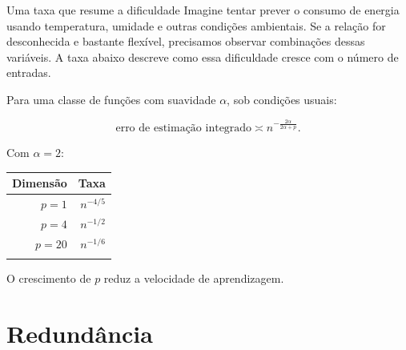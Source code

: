 \documentclass[
  10pt,
  ignorenonframetext,
  aspectratio=169,
  brazilian,
]{beamer}
\newcounter{none} %
\begin{document}
\begin{frame}{Uma taxa que resume a dificuldade}
\protect{}\label{uma-taxa-que-resume-a-dificuldade}
Imagine tentar prever o consumo de energia usando temperatura, umidade e
outras condições ambientais. Se a relação for desconhecida e bastante
flexível, precisamos observar combinações dessas variáveis. A taxa
abaixo descreve como essa dificuldade cresce com o número de entradas.

Para uma classe de funções com suavidade \(\alpha\), sob condições
usuais:

\[
\text{erro de estimação integrado}\asymp
n^{-\frac{2\alpha}{2\alpha+p}}.
\]

Com \(\alpha=2\):

{\def\LTcaptype{none} %
\begin{longtable}[]{@{}rr@{}}
\toprule\noalign{}
Dimensão & Taxa \\
\midrule\noalign{}
\endhead
\(p=1\) & \(n^{-4/5}\) \\
\(p=4\) & \(n^{-1/2}\) \\
\(p=20\) & \(n^{-1/6}\) \\
\bottomrule\noalign{}
\end{longtable}
}

O crescimento de \(p\) reduz a velocidade de aprendizagem.

\end{frame}

\section{Redundância}\label{redunduxe2ncia}
\end{document}
